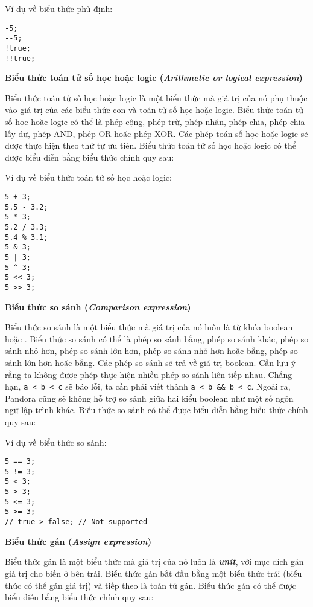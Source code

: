 \regexneexpr

\noindent Ví dụ về biểu thức phủ định:
\begin{lstlisting}[]
-5;
--5;
!true;
!!true;
\end{lstlisting}

\noindent\textbf{Biểu thức toán tử số học hoặc logic (\textit{Arithmetic or logical expression})}

    Biểu thức toán tử số học hoặc logic là một biểu thức mà giá trị của nó phụ thuộc vào giá trị của các biểu thức con và toán tử số học hoặc logic. Biểu thức toán tử số học hoặc logic có thể là phép cộng, phép trừ, phép nhân, phép chia, phép chia lấy dư, phép AND, phép OR hoặc phép XOR. Các phép toán số học hoặc logic sẽ được thực hiện theo thứ tự ưu tiên. Biểu thức toán tử số học hoặc logic có thể được biểu diễn bằng biểu thức chính quy sau:

\regexarithlogicexpr

\noindent Ví dụ về biểu thức toán tử số học hoặc logic:
\begin{lstlisting}[]
5 + 3;
5.5 - 3.2;
5 * 3;
5.2 / 3.3;
5.4 % 3.1;
5 & 3;
5 | 3;
5 ^ 3;
5 << 3;
5 >> 3;
\end{lstlisting}

\noindent\textbf{Biểu thức so sánh (\textit{Comparison expression})}

    Biểu thức so sánh là một biểu thức mà giá trị của nó luôn là từ khóa boolean  hoặc . Biểu thức so sánh có thể là phép so sánh bằng, phép so sánh khác, phép so sánh nhỏ hơn, phép so sánh lớn hơn, phép so sánh nhỏ hơn hoặc bằng, phép so sánh lớn hơn hoặc bằng. Các phép so sánh sẽ trả về giá trị boolean. Cần lưu ý rằng ta không được phép thực hiện nhiều phép so sánh liên tiếp nhau. Chẳng hạn, \texttt{a < b < c} sẽ báo lỗi, ta cần phải viết thành \texttt{a < b \&\& b < c}. Ngoài ra, Pandora cũng sẽ không hỗ trợ so sánh giữa hai kiểu boolean như một số ngôn ngữ lập trình khác. Biểu thức so sánh có thể được biểu diễn bằng biểu thức chính quy sau:

\regexcompexpr

\noindent Ví dụ về biểu thức so sánh:
\begin{lstlisting}[]
5 == 3;
5 != 3;
5 < 3;
5 > 3;
5 <= 3;
5 >= 3;
// true > false; // Not supported
\end{lstlisting}

\noindent\textbf{Biểu thức gán (\textit{Assign expression})}

    Biểu thức gán là một biểu thức mà giá trị của nó luôn là \textbf{\textit{unit}}, với mục đích gán giá trị cho biến ở bên trái. Biểu thức gán bắt đầu bằng một biểu thức trái (biểu thức có thể gán giá trị) và tiếp theo là toán tử gán. Biểu thức gán có thể được biểu diễn bằng biểu thức chính quy sau:

